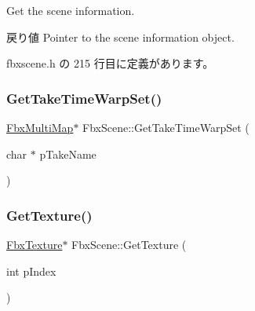 Get the scene information. \begin{DoxyReturn}{戻り値}
Pointer to the scene information object. 
\end{DoxyReturn}


 fbxscene.\+h の 215 行目に定義があります。

\mbox{\label{class_fbx_scene_a36e7860a68461f8fa9bf2a78285a36b6}} 
\subsubsection{\texorpdfstring{Get\+Take\+Time\+Warp\+Set()}{GetTakeTimeWarpSet()}}
{\footnotesize\ttfamily \hyperlink{class_fbx_multi_map}{Fbx\+Multi\+Map}$\ast$ Fbx\+Scene\+::\+Get\+Take\+Time\+Warp\+Set (\begin{DoxyParamCaption}\item[{char $\ast$}]{p\+Take\+Name }\end{DoxyParamCaption})}

\mbox{\label{class_fbx_scene_a0636380a7984fd690eb37720b5cc4f9a}} 
\subsubsection{\texorpdfstring{Get\+Texture()}{GetTexture()}\hspace{0.1cm}{\footnotesize\ttfamily [1/2]}}
{\footnotesize\ttfamily \hyperlink{class_fbx_texture}{Fbx\+Texture}$\ast$ Fbx\+Scene\+::\+Get\+Texture (\begin{DoxyParamCaption}\item[{int}]{p\+Index }\end{DoxyParamCaption})}

